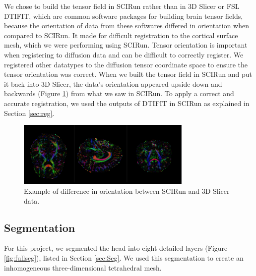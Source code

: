 We chose to build the tensor field in SCIRun rather than in 3D Slicer \cite{ref:slicer} or FSL DTIFIT, which are common software packages for building brain tensor fields, because the orientation of data from these softwares differed in orientation when compared to SCIRun. It made for difficult registration to the cortical surface mesh, which we were performing using SCIRun. Tensor orientation is important when registering to diffusion data and can be difficult to correctly register. We registered other datatypes to the diffusion tensor coordinate space to ensure the tensor orientation was correct. When we built the tensor field in SCIRun and put it back into 3D Slicer, the data's orientation appeared upside down and backwards (Figure \ref{fig:backwards}) from what we saw in SCIRun. To apply a correct and accurate registration, we used the outputs of DTIFIT in SCIRun as explained in Section \ref{sec:reg}.

\begin{figure}[H]
\begin{center}
\includegraphics[width=0.75\textwidth]{Figures/backwards.png}
\caption{Example of difference in orientation between SCIRun and 3D
  Slicer data.}
\label{fig:backwards}
\end{center}
\end{figure}

\subsection{Segmentation}

For this project, we segmented the head into eight detailed layers (Figure \ref{fig:fullseg}), listed in Section \ref{sec:Seg}. We used this segmentation to create an inhomogeneous three-dimensional tetrahedral mesh.

